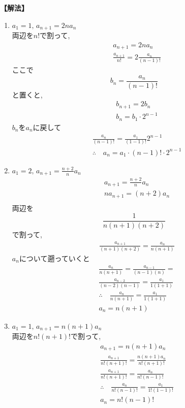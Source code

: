 \noindent\textbf{【解法】}
\begin{enumerate}[label=(\arabic*),parsep=3pt]
  \item $\displaystyle a_1=1,\, a_{n+1}=2na_n$\\
        両辺を$n!$で割って,
        \begin{align*}
           & a_{n+1}=2na_n                          \\
           & \frac{a_{n+1}}{n!}=2\frac{a_n}{(n-1)!}
        \end{align*}
        ここで
        \[
          b_n=\frac{a_n}{(n-1)!}
        \]
        と置くと,
        \begin{align*}
           & b_{n+1}=2b_n         \\
           & b_n=b_1\cdot 2^{n-1}
        \end{align*}
        $b_n$を$a_n$に戻して
        \begin{align*}
           & \frac{a_n}{(n-1)!}=\frac{a_1}{(1-1)!}2^{n-1}        \\
           & \therefore \quad a_n=a_1 \cdot (n-1)! \cdot 2^{n-1}
        \end{align*}

  \item $\displaystyle a_1=2,\, a_{n+1}=\frac{n+2}{n}a_n$
        \begin{align*}
           & a_{n+1}=\frac{n+2}{n}a_n \\
           & na_{n+1}=(n+2)a_n        \\
        \end{align*}
        両辺を
        \[
          \displaystyle \frac{1}{n(n+1)(n+2)}
        \]
        で割って,
        \begin{align*}
           & \frac{a_{n+1}}{(n+1)(n+2)}=\frac{a_{n}}{n(n+1)}
        \end{align*}
        $a_n$について遡っていくと
        \begin{align*}
           & \frac{a_{n}}{n(n+1)}=\frac{a_{n-1}}{(n-1)(n)}=\\
           & \frac{a_{n-2}}{(n-2)(n-1)}=\frac{a_{1}}{1(1+1)} \\
           & \therefore \quad \frac{a_{n}}{n(n+1)}=\frac{a_{1}}{1(1+1)}                                           \\
           & a_n=n(n+1)
        \end{align*}
  \item $\displaystyle a_1=1,\, a_{n+1}=n(n+1)a_n$\\
        両辺を$n!(n+1)!$で割って,
        \begin{align*}
           & a_{n+1}=n(n+1)a_n                                          \\
           & \frac{a_{n+1}}{n!(n+1)!}=\frac{n(n+1)a_n}{n!(n+1)!}        \\
           & \frac{a_{n+1}}{n!(n+1)!}=\frac{a_n}{n!(n-1)!}              \\
           & \therefore \quad \frac{a_n}{n!(n-1)!}=\frac{a_1}{1!(1-1)!} \\
           & a_n=n!(n-1)!
        \end{align*}
\end{enumerate}

